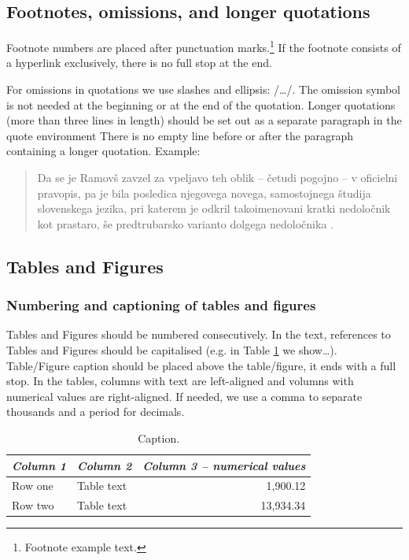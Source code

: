 \documentclass{article}
\begin{document}
\subsection{Footnotes, omissions, and longer quotations}
Footnote numbers are placed after punctuation marks.\footnote{Footnote example text.} If the footnote consists of a hyperlink exclusively, there is no full stop at the end.

For omissions in quotations we use slashes and ellipsis:  /\ldots/. The omission symbol is not needed at the beginning or at the end of the quotation. Longer quotations (more than three lines in length) should be set out as a separate paragraph in the quote environment There is no empty line before or after the paragraph containing a longer quotation. Example:

\begin{quote}
Da se je Ramovš zavzel za vpeljavo teh oblik – četudi pogojno – v oficielni pravopis, pa je bila posledica njegovega novega, samostojnega študija slovenskega jezika, pri katerem je odkril takoimenovani kratki nedoločnik kot prastaro, še predtrubarsko varianto dolgega nedoločnika \cite[p.~198]{vodusek1959}.
\end{quote}

\subsection{Tables and Figures}
\subsubsection{Numbering and captioning of tables and figures}
Tables and Figures should be numbered consecutively. In the text, references to Tables and Figures should be capitalised  (e.g. in Table \ref{slogi} we show\ldots). Table/Figure caption should be placed above the table/figure, it ends with a full stop.  In the tables, columns with text are left-aligned and volumns with numerical values are right-aligned. If needed, we use a comma to separate thousands and a period for decimals.
\begin{table}[h]
\caption{Caption.}
\label{slogi}
\begin{tabularx}{\textwidth}{X|X|r}
\toprule
\textit{Column 1} & \textit{Column 2} & \textit{Column 3 -- numerical values} \\ \midrule
Row one          & Table text       & 1,900.12                                      \\
Row two         & Table text       & 13,934.34                                     \\ \bottomrule
\end{tabularx}
\end{table}
\end{document}
